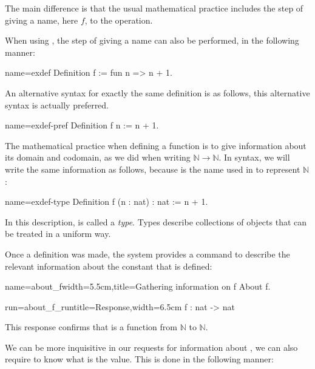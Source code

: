 The main difference is that the usual mathematical practice includes
the step of giving a name, here \(f\), to the operation.

When using \Coq{}, the step of giving a name can also be
performed, in the following manner:

\begin{coq}{name=exdef}{}
Definition f := fun n => n + 1.
\end{coq}
An alternative syntax for exactly the same definition is as follows,
this alternative syntax is actually preferred.

\begin{coq}{name=exdef-pref}{}
Definition f n := n + 1.
\end{coq}
The mathematical practice when defining a function is to give
information about its domain and codomain, as we did when writing
\({\mathbb{N}}\rightarrow{\mathbb{N}}\).  In \Coq{} syntax, we will write
the same information as follows, because  is the name used in
\Coq{} to represent \(\mathbb{N}\):

\begin{coq}{name=exdef-type}{}
Definition f (n : nat) : nat := n + 1.
\end{coq}
In this description,  is called a {\em type}.  Types describe
collections of objects that can be treated in a uniform way.

Once a definition was made, the \Coq{} system provides a command to
describe the relevant information about the constant that is defined:

\begin{coq}{name=about_f}{width=5.5cm,title=Gathering information on f}
About f.
\end{coq}
\begin{coqout}{run=about_f_run}{title=Response,width=6.5cm}
f : nat -> nat
\end{coqout}
This response confirms that  is a function from
\({\mathbb{N}}\) to \({\mathbb{N}}\).

We can be more inquisitive in our requests for information about
, we can also require to know what is the value.  This is done in
the following manner:

